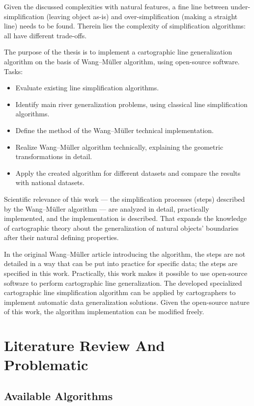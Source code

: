 \documentclass[a4paper]{article}
\newcommand{\WM}{Wang--M{\"u}ller}
\begin{document}
Given the discussed complexities with natural features, a fine line between
under-simplification (leaving object as-is) and over-simplification (making a
straight line) needs to be found. Therein lies the complexity of simplification
algorithms: all have different trade-offs.

The purpose of the thesis is to implement a cartographic line generalization
algorithm on the basis of {\WM} algorithm, using open-source software. Tasks:

\begin{itemize}
    \item Evaluate existing line simplification algorithms.
    \item Identify main river generalization problems, using classical line
        simplification algorithms.
    \item Define the method of the {\WM} technical implementation.
    \item Realize {\WM} algorithm technically, explaining the geometric
        transformations in detail.
    \item Apply the created algorithm for different datasets and compare
        the results with national datasets.
\end{itemize}

Scientific relevance of this work --- the simplification processes (steps)
described by the {\WM} algorithm --- are analyzed in detail, practically
implemented, and the implementation is described. That expands the knowledge of
cartographic theory about the generalization of natural objects' boundaries
after their natural defining properties.

In the original {\WM} article introducing the algorithm, the steps are not
detailed in a way that can be put into practice for specific data; the steps are
specified in this work. Practically, this work makes it possible to use open-source software to perform cartographic line generalization. The developed
specialized cartographic line simplification algorithm can be applied by
cartographers to implement automatic data generalization solutions. Given the
open-source nature of this work, the algorithm implementation can be modified
freely.

\section{Literature Review And Problematic}
\label{sec:literature-review-problematic}

\subsection{Available Algorithms}
\end{document}
